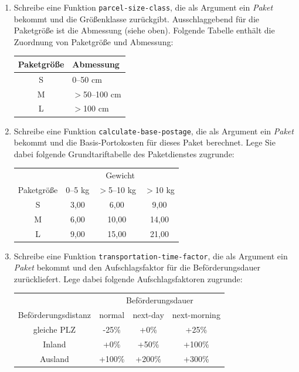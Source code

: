 \begin{aufgabe}
\begin{enumerate}
  \item Schreibe eine Funktion \texttt{parcel-size-class}, die
    als Argument ein \textit{Paket} bekommt und die Größenklasse
    zurückgibt.  Ausschlaggebend für die Paketgröße ist die Abmessung
    (siehe oben).  Folgende Tabelle enthält die Zuordnung von
    Paketgröße und Abmessung:

    \begin{center}
      \begin{tabular}{c|l}
        Paketgröße & Abmessung \\
        \hline
        S & 0--50 cm \\
        M & $>$50--100 cm \\
        L & $>$100 cm \\
      \end{tabular}
    \end{center}

  \item Schreibe eine Funktion \texttt{calculate-base-postage},
    die als Argument ein \textit{Paket} bekommt und die
    Basis-Portokosten für dieses Paket berechnet.  Lege Sie dabei
    folgende Grundtariftabelle des Paketdienstes zugrunde:

    \begin{center}
      \begin{tabular}{c|ccc}
        & \multicolumn{3}{c}{Gewicht} \\
        Paketgröße & 0--5 kg & $>$5--10 kg & $>$10 kg \\
        \hline
        S & 3,00 & 6,00 & 9,00 \\
        M & 6,00 & 10,00 & 14,00 \\
        L & 9,00 & 15,00 & 21,00 \\
      \end{tabular}
    \end{center}

    

  \item Schreibe eine Funktion
    \texttt{transportation-time-factor}, die als Argument ein
    \textit{Paket} bekommt und den Aufschlagsfaktor für die
    Beförderungsdauer zurückliefert.  Lege dabei folgende
    Aufschlagsfaktoren zugrunde:
    
    \begin{center}
      \begin{tabular}{c|ccc}
        & \multicolumn{3}{c}{Beförderungsdauer} \\
        Beförderungsdistanz & normal & next-day & next-morning \\
        \hline
        gleiche PLZ & -25\% & +0\% & +25\% \\
        Inland & +0\% & +50\% & +100\% \\
        Ausland & +100\% & +200\% & +300\% \\
      \end{tabular}
    \end{center}
    

\end{enumerate}
\end{aufgabe}
